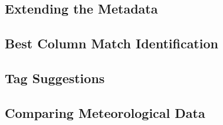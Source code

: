 
\subsection{Extending the Metadata}

\subsection{Best Column Match Identification}

\subsection{Tag Suggestions}

\subsection{Comparing Meteorological Data}